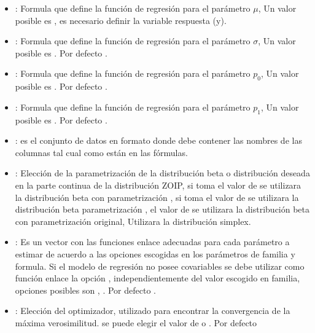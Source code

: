 \begin{itemize}[noitemsep, nolistsep]

\item {}: Formula que define la funci\'{o}n de regresi\'{o}n para el par\'{a}metro $\mu$, Un valor posible es , es necesario definir la variable respuesta (y).
\item {}: Formula que define la funci\'{o}n de regresi\'{o}n para el par\'{a}metro $\sigma$, Un valor posible es . Por defecto .
\item {}: Formula que define la funci\'{o}n de regresi\'{o}n para el par\'{a}metro $p_0$, Un valor posible es . Por defecto .
\item {}: Formula que define la funci\'{o}n de regresi\'{o}n para el par\'{a}metro $p_1$, Un valor posible es . Por defecto .
\item {}: es el conjunto de datos en formato  donde debe contener las nombres de las columnas tal cual como est\'{a}n en las f\'{o}rmulas.
\item {}: Elecci\'{o}n de la parametrizaci\'{o}n de la distribuci\'{o}n beta o distribuci\'{o}n deseada en la parte continua de la distribuci\'{o}n ZOIP, si toma el valor de  se utilizara la distribuci\'{o}n beta con parametrizaci\'{o}n  \cite{Stasinopoulos2}, si toma el valor de  se utilizara la distribuci\'{o}n beta parametrizaci\'{o}n \cite{Ferrari2}, el valor de  se utilizara la distribuci\'{o}n beta con parametrizaci\'{o}n original,  Utilizara la distribuci\'{o}n simplex.
\item {}: Es un vector con las funciones enlace adecuadas para cada par\'{a}metro a estimar de acuerdo a las opciones escogidas en los par\'{a}metros de familia y formula. Si el modelo de regresi\'{o}n no posee covariables se debe utilizar como funci\'{o}n enlace la opci\'{o}n , independientemente del valor escogido en familia, opciones posibles son , . Por defecto .
\item {}: Elecci\'{o}n del optimizador, utilizado para encontrar la convergencia de la m\'{a}xima verosimilitud. se puede elegir el valor de  o . Por defecto 
\end{itemize}

